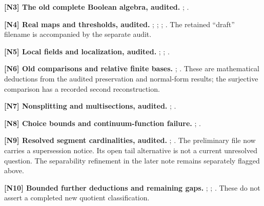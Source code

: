 \noindent\textbf{[N3] The old complete Boolean algebra, audited.}
;
.

\noindent\textbf{[N4] Real maps and thresholds, audited.}
;
;
;
.
The retained ``draft'' filename is accompanied by the separate audit.

\noindent\textbf{[N5] Local fields and localization, audited.}
;
;
.

\noindent\textbf{[N6] Old comparisons and relative finite bases.}
;
.
These are mathematical deductions from the audited preservation and
normal-form results; the surjective comparison has a recorded second
reconstruction.

\noindent\textbf{[N7] Nonsplitting and multisections, audited.}
;
.

\noindent\textbf{[N8] Choice bounds and continuum-function failure.}
;
.

\noindent\textbf{[N9] Resolved segment cardinalities, audited.}
;
.
The preliminary file
now carries a supersession notice.  Its open tail alternative is not
a current unresolved question.  The separability refinement in the
later note remains separately flagged above.

\noindent\textbf{[N10] Bounded further deductions and remaining gaps.}
;
;
.
These do not assert a completed new quotient classification.
\endgroup

